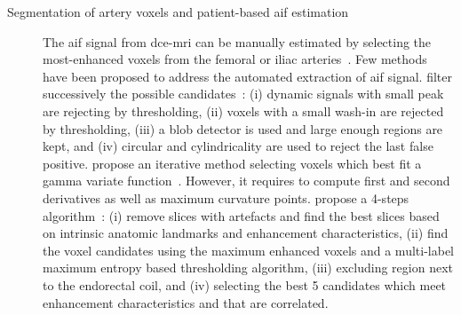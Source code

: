 \begin{description}
  \item[Segmentation of artery voxels and patient-based \ac{aif} estimation] The \ac{aif} signal from \ac{dce}-\ac{mri} can be manually estimated by selecting the most-enhanced voxels from the femoral or iliac arteries~\citep{meng2010comparison}.
    Few methods have been proposed to address the automated extraction of \ac{aif} signal.
    \citeauthor{chen2008automatic} filter successively the possible candidates~\citep{chen2008automatic}:
    (i) dynamic signals with small peak are rejecting by thresholding,
    (ii) voxels with a small wash-in are rejected by thresholding,
    (iii) a blob detector is used and large enough regions are kept, and
    (iv) circular and cylindricality are used to reject the last false positive.
    \citeauthor{zhu2011automated} propose an iterative method selecting voxels which best fit a gamma variate function~\citep{zhu2011automated}.
    However, it requires to compute first and second derivatives as well as maximum curvature points.
    \citeauthor{shanbhag2012generalized} propose a 4-steps algorithm~\citep{shanbhag2012generalized,fennessy2015quantitative}:
    (i) remove slices with artefacts and find the best slices based on intrinsic anatomic landmarks and enhancement characteristics,
    (ii) find the voxel candidates using the maximum enhanced voxels and a multi-label maximum entropy based thresholding algorithm,
    (iii) excluding region next to the endorectal coil, and
    (iv) selecting the best 5 candidates which meet enhancement characteristics and that are correlated.


\end{description}
